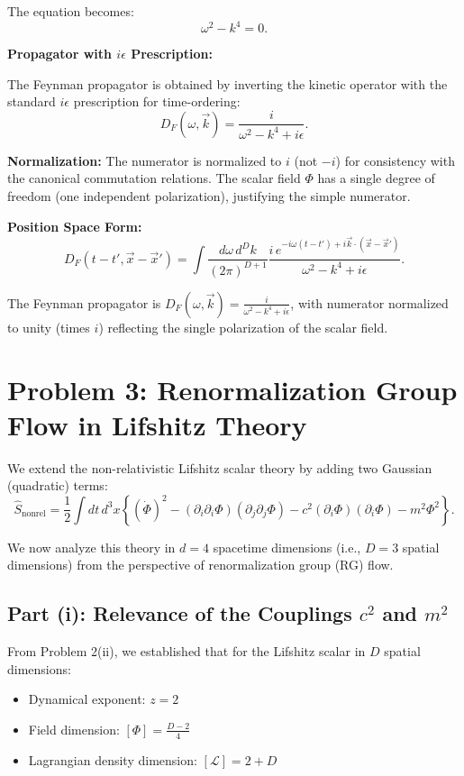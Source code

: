 \documentclass[11pt, a4paper]{article}
\newcommand{\Lscr}{\mathcal{L}}
\newcommand{\be}{\begin{equation}}
\newcommand{\ee}{\end{equation}}
\begin{document}
The equation becomes:
\be
\omega^2 - k^4 = 0.
\ee

\textbf{Propagator with $i\epsilon$ Prescription:}

The Feynman propagator is obtained by inverting the kinetic operator with the standard $i\epsilon$ prescription for time-ordering:
\be
D_F(\omega, \vec{k}) = \frac{i}{\omega^2 - k^4 + i\epsilon}.
\ee

\textbf{Normalization:} The numerator is normalized to $i$ (not $-i$) for consistency with the canonical commutation relations. The scalar field $\Phi$ has a single degree of freedom (one independent polarization), justifying the simple numerator.

\textbf{Position Space Form:}
\be
D_F(t-t', \vec{x}-\vec{x}') = \int \frac{d\omega\,d^Dk}{(2\pi)^{D+1}} \frac{i\,e^{-i\omega(t-t') + i\vec{k}\cdot(\vec{x}-\vec{x}')}}{\omega^2 - k^4 + i\epsilon}.
\ee

The Feynman propagator is $D_F(\omega,\vec{k}) = \frac{i}{\omega^2 - k^4 + i\epsilon}$, with numerator normalized to unity (times $i$) reflecting the single polarization of the scalar field.

\section{Problem 3: Renormalization Group Flow in Lifshitz Theory}

We extend the non-relativistic Lifshitz scalar theory by adding two Gaussian (quadratic) terms:
\be
\hat{S}_{\text{nonrel}}=\frac{1}{2}\int dt\, d^{3}x\left\{(\dot{\Phi})^{2}-(\partial_{i}\partial_{i}\Phi)(\partial_{j}\partial_{j}\Phi)-c^{2}(\partial_{i}\Phi)(\partial_{i}\Phi)-m^{2}\Phi^{2}\right\}.
\ee

We now analyze this theory in $d = 4$ spacetime dimensions (i.e., $D = 3$ spatial dimensions) from the perspective of renormalization group (RG) flow.

\subsection{Part (i): Relevance of the Couplings $c^2$ and $m^2$}

From Problem 2(ii), we established that for the Lifshitz scalar in $D$ spatial dimensions:
\begin{itemize}
    \item Dynamical exponent: $z = 2$
    \item Field dimension: $[\Phi] = \frac{D-2}{4}$
    \item Lagrangian density dimension: $[\Lscr] = 2 + D$
\end{itemize}
\end{document}
